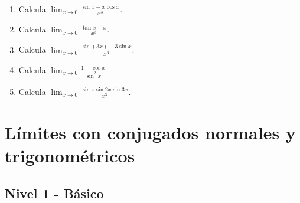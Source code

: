 \documentclass[11pt,a4paper]{article}
\begin{document}
\begin{enumerate}[label=\textbf{E\arabic*.},start=481]
\item Calcula $\displaystyle \lim_{x\to0}\frac{\sin x-x\cos x}{x^3}$.

\item Calcula $\displaystyle \lim_{x\to0}\frac{\tan x-x}{x^3}$.

\item Calcula $\displaystyle \lim_{x\to0}\frac{\sin(3x)-3\sin x}{x^3}$.

\item Calcula $\displaystyle \lim_{x\to0}\frac{1-\cos x}{\sin^2x}$.

\item Calcula $\displaystyle \lim_{x\to0}\frac{\sin x\sin2x\sin3x}{x^3}$.

\end{enumerate}

\newpage

\section{Límites con conjugados normales y trigonométricos}

\subsection{Nivel 1 - Básico}
\end{document}
